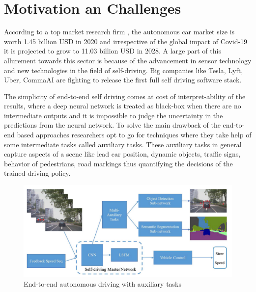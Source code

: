     \section{Motivation an Challenges}
    According to a top market research firm \cite{market_survey}, the autonomous car market size is worth 1.45 billion USD in 2020 and irrespective of the global impact of Covid-19 it is projected to grow to 11.03 billion USD in 2028. A large part of this allurement towards this sector is because of the advancement in sensor technology and new technologies in the field of self-driving. Big companies like Tesla, Lyft, Uber, CommaAI are fighting to release the first full self driving software stack. 
\par The simplicity of end-to-end self driving comes at cost of interpret-ability of the results, where a deep neural network is treated as black-box when there are no intermediate outputs and it is impossible to judge the uncertainty in the predictions from the neural network. To solve the main drawback of the end-to-end based approaches researchers opt to go for techniques where they take help of some intermediate tasks called auxiliary tasks. These auxiliary tasks in general capture aspects of a scene like lead car position, dynamic objects, traffic signs, behavior of pedestrians, road markings thus quantifying the decisions of the trained driving policy. 

 \begin{figure}[h]
    \centering
    \includegraphics[width=\textwidth]{images/motivation.png}
    \caption{End-to-end autonomous driving with auxiliary tasks \cite{Wang2019EndtoEndSU}}
\end{figure}

